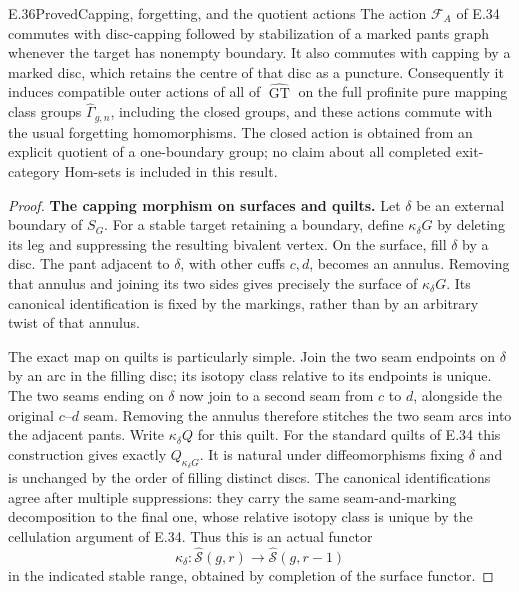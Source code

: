 \begin{result}{E.36}{Proved}{Capping, forgetting, and the quotient actions}
The action $\mathcal F_A$ of E.34 commutes with
disc-capping followed by stabilization of a
marked pants graph whenever the target has
nonempty boundary.  It also commutes with
capping by a marked disc, which retains the
centre of that disc as a puncture.
Consequently it induces compatible outer
actions of all of $\widehat{\operatorname{GT}}$
on the full profinite pure mapping class
groups $\widehat\Gamma_{g,n}$, including the
closed groups, and these actions commute
with the usual forgetting homomorphisms.
The closed action is obtained from an
explicit quotient of a one-boundary group;
no claim about all completed exit-category
Hom-sets is included in this result.
\end{result}
\begin{proof}
\noindent\textbf{The capping morphism on surfaces and quilts.}
Let $\delta$ be an external boundary of
$S_G$.  For a stable target retaining a
boundary, define $\kappa_\delta G$ by
deleting its leg and suppressing the
resulting bivalent vertex.  On the surface,
fill $\delta$ by a disc.  The pant adjacent
to $\delta$, with other cuffs $c,d$,
becomes an annulus.  Removing that annulus
and joining its two sides gives precisely
the surface of $\kappa_\delta G$.
Its canonical identification is fixed by
the markings, rather than by an arbitrary
twist of that annulus.

The exact map on quilts is particularly
simple.  Join the two seam endpoints on
$\delta$ by an arc in the filling disc;
its isotopy class relative to its endpoints
is unique.  The two seams ending on
$\delta$ now join to a second seam from
$c$ to $d$, alongside the original
$c$--$d$ seam.  Removing the annulus
therefore stitches the two seam arcs
into the adjacent pants.  Write
$\kappa_\delta Q$ for this quilt.
For the standard quilts of E.34 this
construction gives exactly
$Q_{\kappa_\delta G}$.
It is natural under diffeomorphisms
fixing $\delta$ and is unchanged by
the order of filling distinct discs.
The canonical identifications agree
after multiple suppressions: they
carry the same seam-and-marking
decomposition to the final one, whose
relative isotopy class is unique by
the cellulation argument of E.34.
Thus this is an actual functor
\[
 \kappa_\delta:\widehat{\mathcal S}(g,r)
       \longrightarrow\widehat{\mathcal S}(g,r-1)
                                                               \tag{E.130}
\]
in the indicated stable range, obtained
by completion of the surface functor.


\end{proof}
